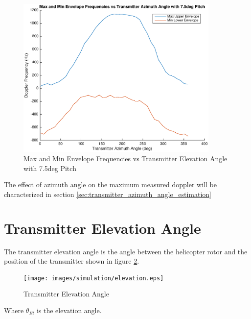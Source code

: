 \begin{figure}
	\begin{center}
		\includegraphics[width=10cm]{images/simulation/pitch_azimuth_rev.eps}
		\caption{Max and Min Envelope Frequencies vs Transmitter Elevation Angle with 7.5deg Pitch}
		\label{fig:pitch_azimuth_rev}
	\end{center}
\end{figure}

The effect of azimuth angle on the maximum measured doppler will be characterized in section \ref{sec:transmitter_azimuth_angle_estimation}

\section{Transmitter Elevation Angle} \label{sec:tea}
The transmitter elevation angle is the angle between the helicopter rotor and the position of the transmitter shown in figure \ref{fig:azimuth_rel}.

\begin{figure}
	\begin{center}
		\texttt{[image: images/simulation/elevation.eps]}
		\caption{Transmitter Elevation Angle}
		\label{fig:azimuth_rel}
	\end{center}
\end{figure}

Where $\theta_{El}$ is the elevation angle. 

